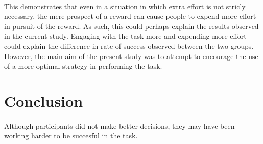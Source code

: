 \documentclass[12pt]{article}
\begin{document}
\paragraph{} This demonstrates that even in a situation in which extra effort is not stricly necessary, the mere prospect of a reward can cause people to expend more effort in pursuit of the reward. As such, this could perhaps explain the results observed in the current study. Engaging with the task more and expending more effort could explain the difference in rate of success observed between the two groups. However, the main aim of the present study was to attempt to encourage the use of a more optimal strategy in performing the task. 

\section*{Conclusion}
\paragraph{} Although participants did not make better decisions, they may have been working harder to be succesful in the task. 
\clearpage
\begingroup\onehalfspacing
\newpage
{}


\endgroup
\end{document}
